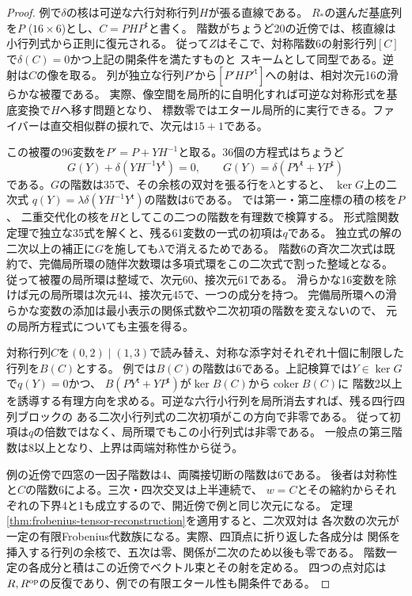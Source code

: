 \begin{proof}
例で$\delta$の核は可逆な六行対称行列$H$が張る直線である。
$R_*$の選んだ基底列を$P$ ($16\times6$)とし、$C=PHP^{\mathsf t}$と書く。
階数がちょうど20の近傍では、核直線は小行列式から正則に復元される。
従って$Z$はそこで、対称階数6の射影行列$[C]$で$\delta(C)=0$かつ上記の開条件を満たすものと
スキームとして同型である。逆射は$C$の像を取る。
列が独立な行列$P'$から$[P' H P'^{\mathsf t}]$への射は、相対次元16の滑らかな被覆である。
実際、像空間を局所的に自明化すれば可逆な対称形式を基底変換で$H$へ移す問題となり、
標数零ではエタール局所的に実行できる。ファイバーは直交相似群の捩れで、次元は$15+1$である。

この被覆の96変数を$P'=P+YH^{-1}$と取る。36個の方程式はちょうど
\[
 G(Y)+\delta(YH^{-1}Y^{\mathsf t})=0,\qquad
 G(Y)=\delta(PY^{\mathsf t}+YP^{\mathsf t})
\]
である。$G$の階数は35で、その余核の双対を張る行を$\lambda$とすると、
$\ker G$上の二次式 $q(Y)=\lambda\delta(YH^{-1}Y^{\mathsf t})$の階数は6である。
では第一・第二座標の積の核を$P$、
二重交代化の核を$H$としてこの二つの階数を有理数で検算する。
形式陰関数定理で独立な35式を解くと、残る61変数の一式の初項は$q$である。
独立式の解の二次以上の補正に$G$を施しても$\lambda$で消えるためである。
階数6の斉次二次式は既約で、完備局所環の随伴次数環は多項式環をこの二次式で割った整域となる。
従って被覆の局所環は整域で、次元60、接次元61である。
滑らかな16変数を除けば元の局所環は次元44、接次元45で、一つの成分を持つ。
完備局所環への滑らかな変数の添加は最小表示の関係式数や二次初項の階数を変えないので、
元の局所方程式についても主張を得る。

対称行列$C$を$(0,2)\mid(1,3)$で読み替え、対称な添字対それぞれ十個に制限した行列を$B(C)$とする。
例では$B(C)$の階数は6である。上記検算では$Y\in\ker G$で$q(Y)=0$かつ、
$B(PY^{\mathsf t}+YP^{\mathsf t})$が$\ker B(C)$から$\operatorname{coker}B(C)$に
階数2以上を誘導する有理方向を求める。可逆な六行小行列を局所消去すれば、残る四行四列ブロックの
ある二次小行列式の二次初項がこの方向で非零である。
従って初項は$q$の倍数ではなく、局所環でもこの小行列式は非零である。
一般点の第三階数は8以上となり、上界は両端対称性から従う。

例の近傍で四窓の一因子階数は4、両隣接切断の階数は6である。
後者は対称性と$C$の階数6による。三次・四次交叉は上半連続で、
$w=C$とその縮約からそれぞれの下界4と1も成立するので、開近傍で例と同じ次元になる。
定理\ref{thm:frobenius-tensor-reconstruction}を適用すると、二次双対は
各次数の次元が一定の有限Frobenius代数族になる。実際、四頂点に折り返した各成分は
関係を挿入する行列の余核で、五次は零、関係が二次のため以後も零である。
階数一定の各成分と積はこの近傍でベクトル束とその射を定める。
四つの点対応は$R,R^{\rm op}$の反復であり、例での有限エタール性も開条件である。


\end{proof}
